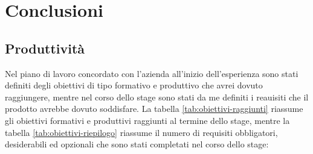 \null\newpage
\chapter{Conclusioni}
\label{cap:conclusioni}

\intro{}

\section{Produttività}
Nel piano di lavoro concordato con l'azienda all'inizio dell'esperienza sono stati definiti degli obiettivi di tipo formativo e produttivo che avrei dovuto raggiungere, mentre nel corso dello stage sono stati da me definiti i reauisiti che il prodotto avrebbe dovuto soddisfare. La tabella \ref{tab:obiettivi-raggiunti} riassume gli obiettivi formativi e produttivi raggiunti al termine dello stage, mentre la tabella \ref{tab:obiettivi-riepilogo} riassume il numero di requisiti obbligatori, desiderabili ed opzionali che sono stati completati nel corso dello stage:\\

